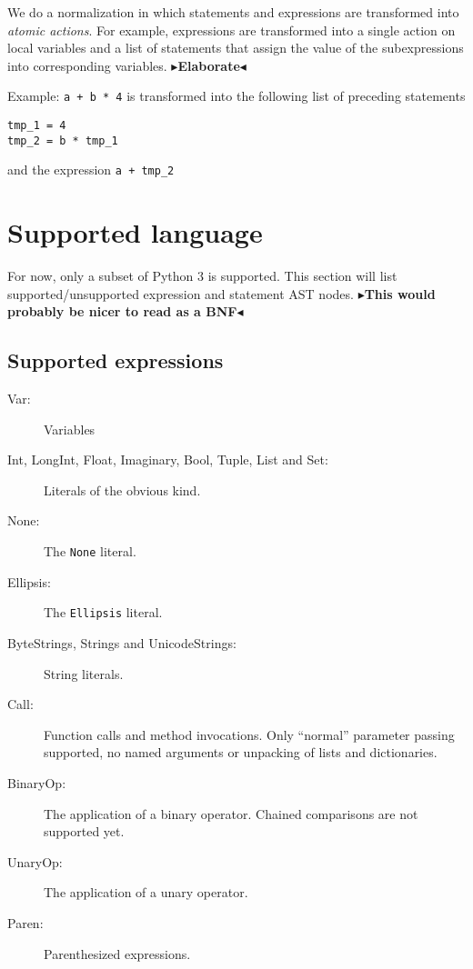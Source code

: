 \documentclass[11pt]{report}
\newcommand{\todo}[1]{{\color[rgb]{.5,0,0}\textbf{$\blacktriangleright$#1$\blacktriangleleft$}}}
\begin{document}
We do a normalization in which statements and expressions are
transformed into \emph{atomic actions}. For example, expressions are
transformed into a single action on local variables and a list of
statements that assign the value of the subexpressions into
corresponding variables. \todo{Elaborate}

Example: \verb!a + b * 4! is transformed into the following list of
preceding statements
\begin{verbatim}
tmp_1 = 4
tmp_2 = b * tmp_1
\end{verbatim}
and the expression \verb!a + tmp_2!

\section{Supported language}
For now, only a subset of Python 3 is supported. This section will
list supported/unsupported expression and statement AST nodes.
\todo{This would probably be nicer to read as a BNF}

\subsection{Supported expressions}
\begin{description}
  \item[Var:] Variables
  \item[Int, LongInt, Float, Imaginary, Bool, Tuple, List and Set:]
    Literals of the obvious kind.
  \item[None:] The \verb|None| literal.
  \item[Ellipsis:] The \verb|Ellipsis| literal.
  \item[ByteStrings, Strings and UnicodeStrings:] String literals.
  \item[Call:] Function calls and method invocations. Only ``normal''
    parameter passing supported, no named arguments or unpacking of
    lists and dictionaries.
  \item[BinaryOp:] The application of a binary operator. Chained
    comparisons are not supported yet.
  \item[UnaryOp:] The application of a unary operator.
  \item[Paren:] Parenthesized expressions.
\end{description}
\end{document}
